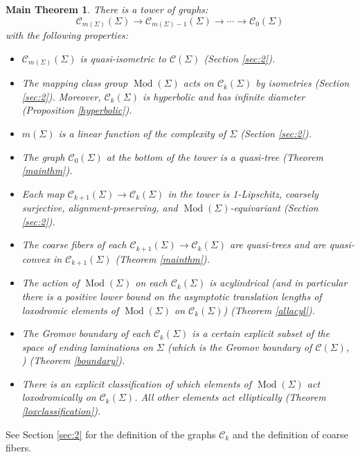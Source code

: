 \documentclass[11pt]{article}
\newtheorem*{main}{Main Theorem}{}
\theoremstyle{remark}
\def\C{{\mathcal C}}
\def\Mod{\operatorname{Mod}}
\begin{document}
\begin{main}
\label{bigthm}
  There is a tower of graphs:
  $$\C_{m(\Sigma)}(\Sigma)\to \C_{m(\Sigma)-1}(\Sigma)\to\cdots\to\C_0(\Sigma)$$
  with the following properties:
  \begin{itemize}
    \item $\C_{m(\Sigma)}(\Sigma)$ is quasi-isometric to $\C(\Sigma)$
          (Section \ref{sec:2}).
    \item The mapping class group $\Mod(\Sigma)$ acts on $\C_k(\Sigma)$
          by isometries (Section \ref{sec:2}).
          Moreover, $\C_k(\Sigma)$ is hyperbolic and has infinite diameter
          (Proposition \ref{hyperbolic}).
    \item $m(\Sigma)$ is a linear function of the complexity of
          $\Sigma$
          (Section \ref{sec:2}).
    \item The graph $\C_0(\Sigma)$ at the bottom of the tower is a
          quasi-tree (Theorem \ref{mainthm}).
    \item Each map $\C_{k+1}(\Sigma)\to\C_k(\Sigma)$ in the tower is 1-Lipschitz,
          coarsely surjective, alignment-preserving, and $\Mod(\Sigma)$-equivariant
          (Section \ref{sec:2}).
    \item The coarse fibers of each $\C_{k+1}(\Sigma)\to\C_k(\Sigma)$ are
          quasi-trees and are quasi-convex in $\C_{k+1}(\Sigma)$ (Theorem \ref{mainthm}).
    \item The action of $\Mod(\Sigma)$ on each $\C_k(\Sigma)$ is
          acylindrical (and in particular there is a positive
          lower bound on the asymptotic translation lengths of loxodromic
          elements of $\Mod(\Sigma)$ on $\C_k(\Sigma)$) (Theorem \ref{allacyl}).
    \item The Gromov boundary of each $\C_k(\Sigma)$ is a certain
          explicit subset of the space of ending laminations on
          $\Sigma$ (which is the Gromov boundary of $\C(\Sigma)$,
          \cite{klarreich}) (Theorem \ref{boundary}).
    \item There is an explicit classification of which elements of
          $\Mod(\Sigma)$ act loxodromically on $\C_k(\Sigma)$. All other
          elements act elliptically (Theorem \ref{loxclassification}).
  \end{itemize}
\end{main}

\noindent See Section \ref{sec:2} for the definition of the graphs $\C_k$
and the definition of coarse fibers.
\end{document}
